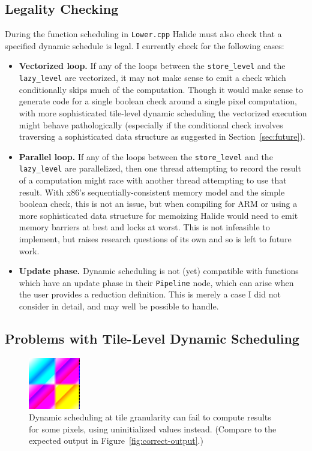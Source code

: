 \documentclass{article}
\begin{document}
\subsection{Legality Checking}

During the function scheduling in \texttt{Lower.cpp} Halide must also check that a specified dynamic schedule is legal. I currently check for the following cases:

\begin{itemize}
	\item {\bf Vectorized loop.} If any of the loops between the \texttt{store\_level} and the \texttt{lazy\_level} are vectorized, it may not make sense to emit a check which conditionally skips much of the computation. Though it would make sense to generate code for a single boolean check around a single pixel computation, with more sophisticated tile-level dynamic scheduling the vectorized execution might behave pathologically (especially if the conditional check involves traversing a sophisticated data structure as suggested in Section~\ref{sec:future}).
	\item {\bf Parallel loop.} If any of the loops between the \texttt{store\_level} and the \texttt{lazy\_level} are parallelized, then one thread attempting to record the result of a computation might race with another thread attempting to use that result. With x86's sequentially-consistent memory model and the simple boolean check, this is not an issue, but when compiling for ARM or using a more sophisticated data structure for memoizing Halide would need to emit memory barriers at best and locks at worst. This is not infeasible to implement, but raises research questions of its own and so is left to future work.
	\item {\bf Update phase.} Dynamic scheduling is not (yet) compatible with functions which have an update phase in their \texttt{Pipeline} node, which can arise when the user provides a reduction definition. This is merely a case I did not consider in detail, and may well be possible to handle.
\end{itemize}

\subsection{Problems with Tile-Level Dynamic Scheduling}
\label{sec:problem}

\begin{figure}
	\begin{center}
	\includegraphics[width=0.2\textwidth]{bloopers/01.png}
	\end{center}
	\caption{Dynamic scheduling at tile granularity can fail to compute results for some pixels, using uninitialized values instead. (Compare to the expected output in Figure~\ref{fig:correct-output}.)}
	\label{fig:uh-oh}
\end{figure}
\end{document}
